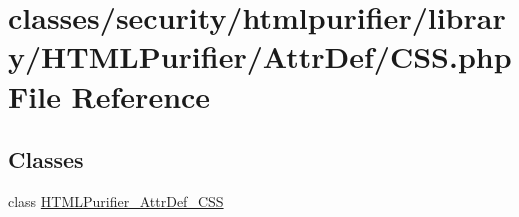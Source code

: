 \hypertarget{CSS_8php}{\section{classes/security/htmlpurifier/library/\+H\+T\+M\+L\+Purifier/\+Attr\+Def/\+C\+S\+S.php File Reference}
\label{CSS_8php}
}
\subsection*{Classes}
\begin{DoxyCompactItemize}
\item 
class \hyperlink{classHTMLPurifier__AttrDef__CSS}{H\+T\+M\+L\+Purifier\+\_\+\+Attr\+Def\+\_\+\+C\+S\+S}
\end{DoxyCompactItemize}
